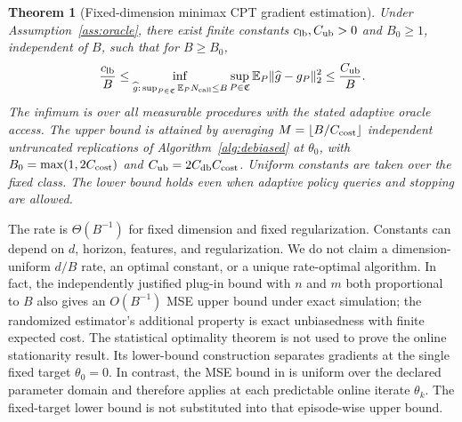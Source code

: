 \documentclass[11pt]{article}
\newtheorem{theorem}{Theorem}[section]
\newcommand{\E}{\mathbb E}
\newcommand{\1}{\mathbf 1}
\DeclarePairedDelimiter{\norm}{\lVert}{\rVert}
\newcommand{\db}{\mathrm{db}}
\begin{document}
\begin{theorem}[Fixed-dimension minimax CPT gradient estimation]\label{thm:minimax}
Under Assumption~\ref{ass:oracle}, there exist finite constants $c_{\rm lb},C_{\rm ub}>0$ and $B_0\ge1$, independent of $B$, such that for $B\ge B_0$,
\begin{equation}\label{eq:minimax}
 \frac{c_{\rm lb}}B\le
 \inf_{\widehat g:\,\sup_{P\in\mathfrak C}\E_P N_{\rm call}\le B}
 \sup_{P\in\mathfrak C}\E_P\norm{\widehat g-g_P}_2^2
 \le\frac{C_{\rm ub}}B.
\end{equation}
The infimum is over all measurable procedures with the stated adaptive oracle access. The upper bound is attained by averaging
$M=\lfloor B/C_{\rm cost}\rfloor$ independent untruncated replications of Algorithm~\ref{alg:debiased} at $\theta_0$, with
$B_0=\max(1,2C_{\rm cost})$ and $C_{\rm ub}=2C_{\db}C_{\rm cost}$. Uniform constants are taken over the fixed class. The lower bound holds even when adaptive policy queries and stopping are allowed.
\end{theorem}

The rate is $\Theta(B^{-1})$ for fixed dimension and fixed regularization. Constants can depend on $d$, horizon, features, and regularization. We do not claim a dimension-uniform $d/B$ rate, an optimal constant, or a unique rate-optimal algorithm. In fact, the independently justified plug-in bound with $n$ and $m$ both proportional to $B$ also gives an $O(B^{-1})$ MSE upper bound under exact simulation; the randomized estimator's additional property is exact unbiasedness with finite expected cost. The statistical optimality theorem is not used to prove the online stationarity result. Its lower-bound construction separates gradients at the single fixed target $\theta_0=0$. In contrast, the MSE bound in  is uniform over the declared parameter domain and therefore applies at each predictable online iterate $\theta_k$. The fixed-target lower bound is not substituted into that episode-wise upper bound.
\end{document}

